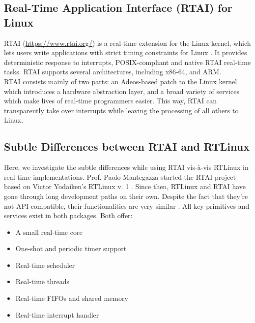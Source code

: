 \documentclass[12pt]{report}
\begin{document}
\subsection{Real-Time Application Interface (RTAI) for Linux}
RTAI (\url{https://www.rtai.org/}) is a real-time extension for the Linux kernel, which lets users write applications with strict timing constraints for Linux \cite{wiki-rtai} \cite{real-time-cap}. It provides deterministic response to interrupts, POSIX-compliant and native RTAI real-time tasks. RTAI supports several architectures, including x86-64, and ARM.\\

RTAI consists mainly of two parts: an Adeos-based patch \cite{adeos} to the Linux kernel which introduces a hardware abstraction layer, and a broad variety of services which make lives of real-time programmers easier. This way, RTAI can transparently take over interrupts while leaving the processing of all others to Linux. \\

\subsection{Subtle Differences between RTAI and RTLinux}
Here, we investigate the subtle differences while using RTAI vis-\`a-vis RTLinux in real-time implementations. Prof. Paolo Mantegazza started the RTAI project based on Victor Yodaiken's RTLinux v. 1 \cite{embd-rtlinux}. Since then, RTLinux and RTAI have gone through long development paths on their own. Despite the fact that they're not API-compatible, their functionalities are very similar \cite{rtai-linux-journal}. All key primitives and services exist in both packages. Both offer:
\begin{itemize}
    \setlength\itemsep{-0.2em}
    \item A small real-time core
    \item One-shot and periodic timer support
    \item Real-time scheduler
    \item Real-time threads
    \item Real-time FIFOs and shared memory
    \item Real-time interrupt handler
\end{itemize}
\end{document}
